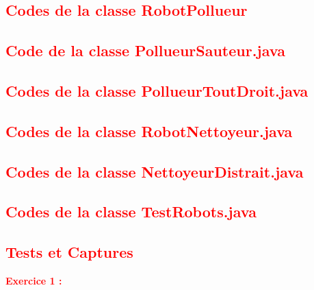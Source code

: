 \documentclass{article}
\begin{document}
	
	\textcolor{red}{\subsection*{Codes de la classe RobotPollueur}}
	
	\textcolor{red}{\subsection*{Code de la classe PollueurSauteur.java}}
	
	\textcolor{red}{\subsection*{Codes de la classe PollueurToutDroit.java}}
	
	\textcolor{red}{\subsection*{Codes de la classe RobotNettoyeur.java}}
	
	\textcolor{red}{\subsection*{Codes de la classe NettoyeurDistrait.java}}
	
	\textcolor{red}{\subsection*{Codes de la classe TestRobots.java}}
	

\textcolor{red}{\section*{Tests et Captures}}
\textcolor{red}{\textbf{\Large{Exercice 1 :}}}\\
\end{document}
